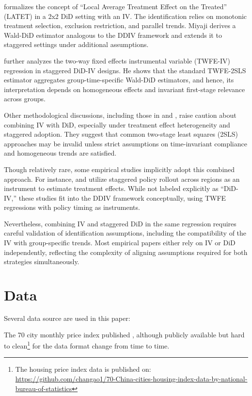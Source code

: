 \documentclass[12pt,english]{article}
\begin{document}
	\cite{miyaji2024a} formalizes the concept of ``Local Average Treatment Effect on the Treated'' (LATET) in a 2x2 DiD setting with an IV. The identification relies on monotonic treatment selection, exclusion restriction, and parallel trends. Miyaji derives a Wald-DiD estimator analogous to the DDIV framework and extends it to staggered settings under additional assumptions.
	
	\cite{miyaji2024b} further analyzes the two-way fixed effects instrumental variable (TWFE-IV) regression in staggered DiD-IV designs. He shows that the standard TWFE-2SLS estimator aggregates group-time-specific Wald-DiD estimators, and hence, its interpretation depends on homogeneous effects and invariant first-stage relevance across groups.
	
	Other methodological discussions, including those in \cite{de2023two} and \cite{borusyak2024revisiting}, raise caution about combining IV with DiD, especially under treatment effect heterogeneity and staggered adoption. They suggest that common two-stage least squares (2SLS) approaches may be invalid unless strict assumptions on time-invariant compliance and homogeneous trends are satisfied.
	
	Though relatively rare, some empirical studies implicitly adopt this combined approach. For instance, \cite{duflo2001} and \cite{black2005} utilize staggered policy rollout across regions as an instrument to estimate treatment effects. While not labeled explicitly as ``DiD-IV,'' these studies fit into the DDIV framework conceptually, using TWFE regressions with policy timing as instruments.
	
	Nevertheless, combining IV and staggered DiD in the same regression requires careful validation of identification assumptions, including the compatibility of the IV with group-specific trends. Most empirical papers either rely on IV or DiD independently, reflecting the complexity of aligning assumptions required for both strategies simultaneously.
	
	\section{Data}\label{sec:data}
	Several data source are used in this paper:
	
	The 70 city monthly price index published \cite{nbs_housing_prices}, although publicly available but hard to clean\footnote{The housing price index data is published on: \href{https://github.com/changao1/70-China-cities-housing-index-data-by-national-bureau-of-statistics}{https://github.com/changao1/70-China-cities-housing-index-data-by-national-bureau-of-statistics}} for the data format change from time to time.
	
\end{document}
